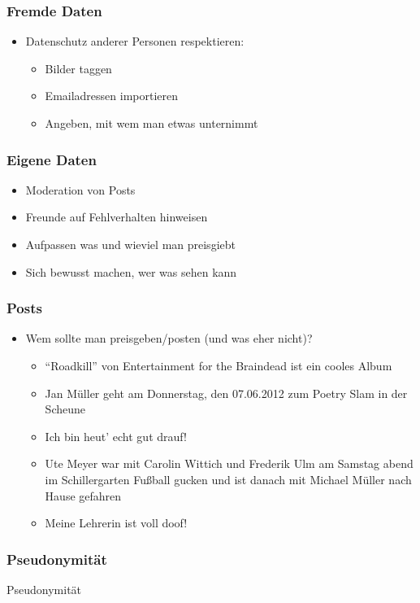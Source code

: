 \documentclass[12pt]{beamer}
\begin{document}
\begin{frame}
  \frametitle{Fremde Daten}
  \begin{itemize}
    \item Datenschutz anderer Personen respektieren:
      \begin{itemize}
        \item<2->Bilder taggen
        \item<3->Emailadressen importieren
        \item<4->Angeben, mit wem man etwas unternimmt
      \end{itemize}
  \end{itemize}
\end{frame}

\begin{frame}
  \frametitle{Eigene Daten}
    \begin{itemize}
      \item<2->Moderation von Posts
      \item<3->Freunde auf Fehlverhalten hinweisen
      \item<4->Aufpassen was und wieviel man preisgiebt
      \item<5->Sich bewusst machen, wer was sehen kann
    \end{itemize}
\end{frame}

\begin{frame}
  \frametitle{Posts}
  \begin{itemize}
    \item Wem sollte man preisgeben/posten (und was eher nicht)?
      \begin{itemize}
        \item<2-> "`Roadkill"' von Entertainment for the Braindead ist ein cooles Album
        \item<3-> Jan Müller geht am Donnerstag, den 07.06.2012 zum Poetry Slam in der Scheune
        \item<4-> Ich bin heut' echt gut drauf!
        \item<5-> Ute Meyer war mit Carolin Wittich und Frederik Ulm am Samstag abend im Schillergarten Fußball gucken und ist danach mit Michael Müller nach Hause gefahren
        \item<6-> Meine Lehrerin ist voll doof!
      \end{itemize}
  \end{itemize}
\end{frame}

\begin{frame}
  \frametitle{Pseudonymität}
  \begin{center} \Large
    Pseudonymität
  \end{center}
\end{frame}
\end{document}
